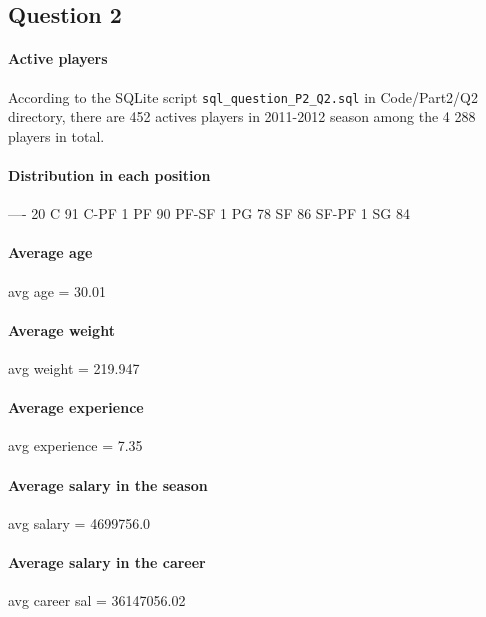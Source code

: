 
\subsection{Question 2}
\label{subsec:412}

\paragraph{Active players}According to the SQLite script \verb|sql_question_P2_Q2.sql| in Code/Part2/Q2 directory, there are 452 actives players in 2011-2012 season among the 4 288 players in total.

\paragraph{Distribution in each position}

 ----	20
 C	91
 C-PF	1
 PF	90
 PF-SF	1
 PG	78
 SF	86
 SF-PF	1
 SG	84

\paragraph{Average age}

avg age 	= 30.01

\paragraph{Average weight}

avg weight 	= 219.947 

\paragraph{Average experience}

avg experience	= 7.35

\paragraph{Average salary in the season}

avg salary	= 4699756.0

\paragraph{Average salary in the career}

avg career sal	= 36147056.02